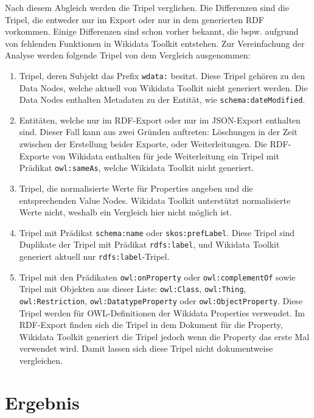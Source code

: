 Nach diesem Abgleich werden die Tripel verglichen.
Die Differenzen sind die Tripel, die entweder nur im Export oder nur in dem generierten RDF vorkommen.
Einige Differenzen sind schon vorher bekannt, die bspw. aufgrund von fehlenden Funktionen in Wikidata Toolkit entstehen.
Zur Vereinfachung der Analyse werden folgende Tripel von dem Vergleich ausgenommen:
\begin{enumerate}
\item Tripel, deren Subjekt das Prefix \verb|wdata:| besitzt. Diese Tripel gehören zu den Data Nodes, welche aktuell von Wikidata Toolkit nicht generiert werden.
Die Data Nodes enthalten Metadaten zu der Entität, wie \verb|schema:dateModified|.
\item Entitäten, welche nur im RDF-Export oder nur im JSON-Export enthalten sind. Dieser Fall kann aus zwei Gründen auftreten: Löschungen in der Zeit zwischen der Erstellung beider Exporte, oder Weiterleitungen.
  Die RDF-Exporte von Wikidata enthalten für jede Weiterleitung ein Tripel mit Prädikat \verb|owl:sameAs|, welche Wikidata Toolkit nicht generiert.
\item Tripel, die normalisierte Werte für Properties angeben und die entsprechenden Value Nodes. Wikidata Toolkit unterstützt normalisierte Werte nicht, weshalb ein Vergleich hier nicht möglich ist.
\item Tripel mit Prädikat \verb|schema:name| oder \verb|skos:prefLabel|. Diese Tripel sind Duplikate der Tripel mit Prädikat \verb|rdfs:label|, und Wikidata Toolkit generiert aktuell nur \verb|rdfs:label|-Tripel.
\item Tripel mit den Prädikaten \verb|owl:onProperty| oder \verb|owl:complementOf| sowie Tripel mit Objekten aus dieser Liste: \verb|owl:Class|, \verb|owl:Thing|, \verb|owl:Restriction|, \verb|owl:DatatypeProperty| oder \verb|owl:ObjectProperty|. Diese Tripel werden für OWL-Definitionen der Wikidata Properties verwendet.
Im RDF-Export finden sich die Tripel in dem Dokument für die Property, Wikidata Toolkit generiert die Tripel jedoch wenn die Property das erste Mal verwendet wird. Damit lassen sich diese Tripel nicht dokumentweise vergleichen.
\end{enumerate}

\section{Ergebnis} 


